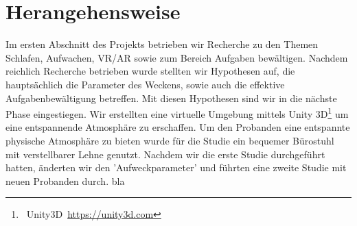 \section{Herangehensweise}\label{sec:approach}  

Im ersten Abschnitt des Projekts betrieben wir Recherche zu den Themen Schlafen, Aufwachen, VR/AR sowie zum Bereich Aufgaben bewältigen. Nachdem reichlich Recherche betrieben wurde stellten wir Hypothesen auf, die hauptsächlich die Parameter des Weckens, sowie auch die effektive Aufgabenbewältigung betreffen. Mit diesen Hypothesen sind wir in die nächste Phase eingestiegen. Wir erstellten eine virtuelle Umgebung mittels Unity 3D\footnote{~Unity3D~\url{https://unity3d.com}} um eine entspannende Atmosphäre zu erschaffen. Um den Probanden eine entspannte physische Atmosphäre zu bieten wurde für die Studie ein bequemer Bürostuhl mit verstellbarer Lehne genutzt. Nachdem wir die erste Studie durchgeführt hatten, änderten wir den 'Aufweckparameter' und führten eine zweite Studie mit neuen Probanden durch.  bla